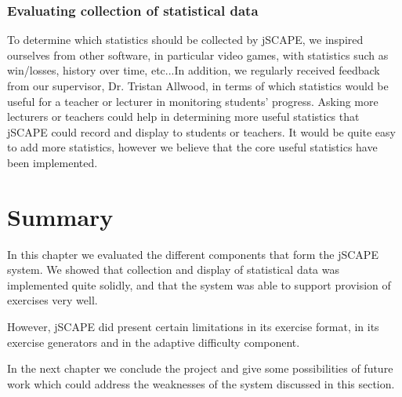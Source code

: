 \subsubsection{Evaluating collection of statistical data}
To determine which statistics should be collected by jSCAPE, we inspired ourselves from other software, in particular video games, with statistics such as win/losses, history over time, etc...In addition, we regularly received feedback from our supervisor, Dr. Tristan Allwood, in terms of which statistics would be useful for a teacher or lecturer in monitoring students' progress. Asking more lecturers or teachers could help in determining more useful statistics that jSCAPE could record and display to students or teachers. It would be quite easy to add more statistics, however we believe that the core useful statistics have been implemented.

\section{Summary}
In this chapter we evaluated the different components that form the jSCAPE system. We showed that collection and display of statistical data was implemented quite solidly, and that the system was able to support provision of exercises very well.\newline

However, jSCAPE did present certain limitations in its exercise format, in its exercise generators and in the adaptive difficulty component. \newline

In the next chapter we conclude the project and give some possibilities of future work which could address the weaknesses of the system discussed in this section.